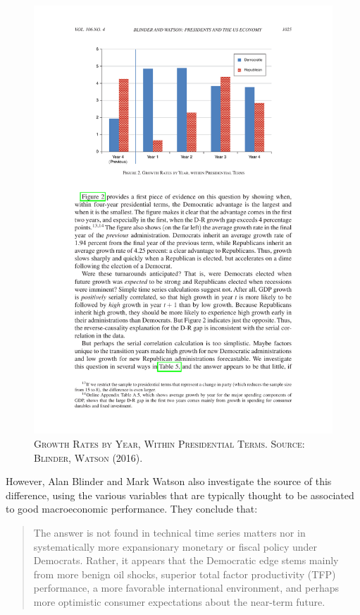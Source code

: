 \documentclass[]{book}
\begin{document}
\begin{figure}

{\centering \includegraphics[width=0.8\linewidth,height=0.8\textheight]{figures/BlinderWatson2016/fig2} 

}

\caption{\textsc{Growth Rates by Year, Within
Presidential Terms. Source: Blinder, Watson (2016).}}\label{fig:BlinderWatson2016-fig2}
\end{figure}

However, Alan Blinder and Mark Watson also investigate the source of
this difference, using the various variables that are typically thought
to be associated to good macroeconomic performance. They conclude that:

\begin{quote}
The answer is not found in technical time series matters nor in
systematically more expansionary monetary or fiscal policy under
Democrats. Rather, it appears that the Democratic edge stems mainly from
more benign oil shocks, superior total factor productivity (TFP)
performance, a more favorable international environment, and perhaps
more optimistic consumer expectations about the near-term future.
\end{quote}
\end{document}
